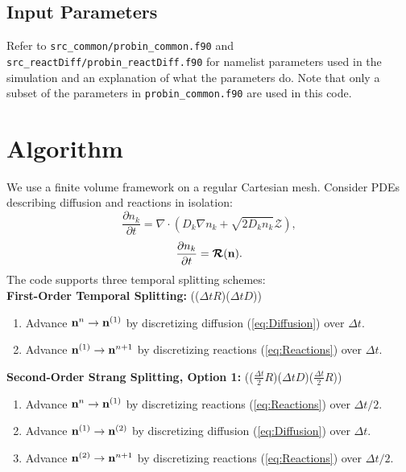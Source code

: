 \documentclass[final]{siamltex}
\def\nb  {{\bf n}}
\def\mRb {\bm{\mathcal{R}}}
\def\mZb {\bm{\mathcal{Z}}}
\begin{document}
\subsection{Input Parameters}
Refer to {\tt src\_common/probin\_common.f90} and 
{\tt src\_reactDiff/probin\_reactDiff.f90} for namelist parameters used in the
simulation and an explanation of what the parameters do.  Note that only a subset
of the parameters in {\tt probin\_common.f90} are used in this code.

\section{Algorithm}
We use a finite volume framework on a regular Cartesian mesh.  Consider PDEs describing
diffusion and reactions in isolation:
\begin{equation}
\frac{\partial n_k}{\partial t} = \nabla\cdot\left(D_k\nabla n_k + \sqrt{2D_kn_k}\mZb\right),\label{eq:Diffusion}
\end{equation}
\begin{equation}
\frac{\partial n_k}{\partial t} = \mRb(\nb).\label{eq:Reactions}
\end{equation}
The code supports three temporal splitting schemes:\\

{\bf First-Order Temporal Splitting:}
(($\Delta t R$)($\Delta t D$))
\begin{enumerate}
\item Advance $\nb^n \rightarrow \nb^{(1)}$ by discretizing 
diffusion (\ref{eq:Diffusion}) over $\Delta t$.
\item Advance $\nb^{(1)} \rightarrow \nb^{n+1}$ by discretizing 
reactions (\ref{eq:Reactions}) over $\Delta t$.
\end{enumerate}

{\bf Second-Order Strang Splitting, Option 1:}
(($\frac{\Delta t}{2}R$)($\Delta t D$)($\frac{\Delta t}{2}R$))
\begin{enumerate}
\item Advance $\nb^n \rightarrow \nb^{(1)}$ by discretizing 
reactions (\ref{eq:Reactions}) over $\Delta t/2$.
\item Advance $\nb^{(1)} \rightarrow \nb^{(2)}$ by discretizing 
diffusion (\ref{eq:Diffusion}) over $\Delta t$.
\item Advance $\nb^{(2)} \rightarrow \nb^{n+1}$ by discretizing 
reactions (\ref{eq:Reactions}) over $\Delta t/2$.
\end{enumerate}
\end{document}
